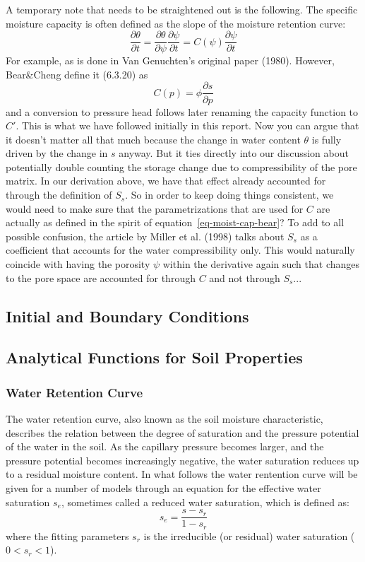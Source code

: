 \documentclass[fleqn]{article}
\begin{document}
{\color{cyan} A temporary note that needs to be straightened out is the 
following. The specific moisture capacity is often defined as the slope
of the moisture retention curve:
\begin{equation}
  \frac{\partial \theta}{\partial t} =  
  \frac{\partial \theta}{\partial \psi} \frac{\partial \psi}{\partial t} =
  C(\psi) \frac{\partial \psi}{\partial t}
\end{equation}
For example, as is done in Van Genuchten's original paper (1980). 
However, Bear\&Cheng define it (6.3.20) as
\begin{equation}
  C(p) = \phi \frac{\partial s}{\partial p}
  \label{eq-moist-cap-bear}
\end{equation}
and a conversion to pressure head follows later renaming the capacity
function to $C'$. This is what we have followed initially in this
report. Now you can argue that it doesn't matter all that
much because the change in water content $\theta$ is fully driven by 
the change in $s$ anyway. But it ties directly into our discussion about
potentially double counting the storage change due to compressibility
of the pore matrix. In our derivation above, we have that effect already
accounted for through the definition of $S_s$. So in order to keep doing 
things consistent, we would need to make sure that the parametrizations that 
are used for $C$ are actually as defined in the spirit of 
equation~\ref{eq-moist-cap-bear}? To add to all possible confusion,
the article by Miller et al. (1998) talks about $S_s$ as a coefficient
that accounts for the water compressibility only. This would naturally
coincide with having the porosity $\psi$ within the derivative again
such that changes to the pore space are accounted for through $C$
and not through $S_s$...
} %

\subsection{Initial and Boundary Conditions}\label{sec-boundary-conditions}


\subsection{Analytical Functions for Soil Properties}
\subsubsection{Water Retention Curve}
The water retention curve, also known as the soil moisture
characteristic, describes the relation between the degree of saturation
and the pressure potential of the water in the soil.  As the capillary
pressure becomes larger, and the pressure potential becomes increasingly
negative, the water saturation reduces up to a residual moisture content.
In what follows the water rentention curve will be given for a number of
models through an equation for the effective water saturation $s_e$, 
sometimes called a reduced water saturation, which is defined as:
\begin{equation}
  s_e = \frac{s - s_r}{1 - s_r}
\end{equation}
where the fitting parameters $s_r$ is the irreducible (or residual) 
water saturation ($0 < s_r < 1$).
\end{document}
